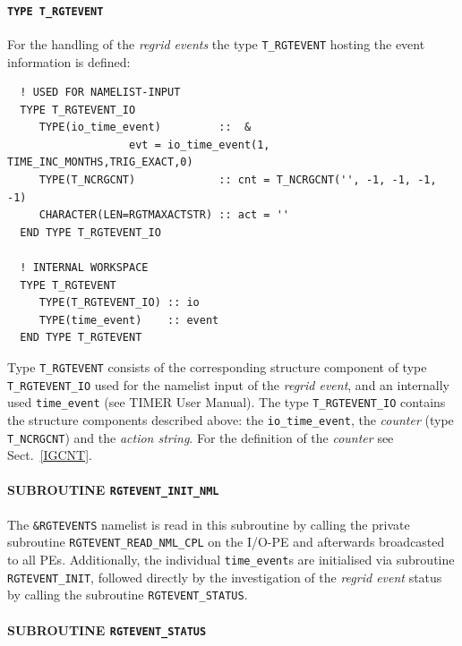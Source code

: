 \documentclass[11pt,twoside]{report}
\begin{document}
\paragraph{\color{red} \tt\bf TYPE T\_RGTEVENT\\\label{IGTRGTEVENT}}

For the handling of the {\it regrid events} the type 
\verb|T_RGTEVENT| hosting the event information is defined:
\begin{verbatim}
  ! USED FOR NAMELIST-INPUT
  TYPE T_RGTEVENT_IO
     TYPE(io_time_event)         ::  &
                   evt = io_time_event(1, TIME_INC_MONTHS,TRIG_EXACT,0)
     TYPE(T_NCRGCNT)             :: cnt = T_NCRGCNT('', -1, -1, -1, -1)
     CHARACTER(LEN=RGTMAXACTSTR) :: act = ''
  END TYPE T_RGTEVENT_IO

  ! INTERNAL WORKSPACE
  TYPE T_RGTEVENT
     TYPE(T_RGTEVENT_IO) :: io
     TYPE(time_event)    :: event
  END TYPE T_RGTEVENT
\end{verbatim}
 Type \verb|T_RGTEVENT| consists of the corresponding structure
 component of type \verb|T_RGTEVENT_IO| used for 
 the namelist input of the {\it regrid event}, and an internally used
 \verb|time_event| (see TIMER 
User Manual). The  type \verb|T_RGTEVENT_IO| contains the structure
 components described above: the \verb|io_time_event|, the {\it counter}
 (type \verb|T_NCRGCNT|) and the {\it  action string}. 
For the definition of the {\it counter} see Sect.~\ref{IGCNT}.\\

\paragraph{SUBROUTINE \color{blue} \tt\bf RGTEVENT\_INIT\_NML\\ \label{IGRGTEVINITNML}}
The \verb|&RGTEVENTS| namelist is read in this subroutine by
calling the  
private subroutine \verb|RGTEVENT_READ_NML_CPL| on the I/O-PE and 
afterwards broadcasted
to all PEs. Additionally, the individual \verb|time_event|s are
initialised via subroutine \verb|RGTEVENT_INIT|, followed directly by
the investigation of the 
{\it regrid event} status by calling the subroutine \verb|RGTEVENT_STATUS|.\\

\paragraph{SUBROUTINE \color{blue} \tt\bf RGTEVENT\_STATUS\\ \label{IGRGTEVSTATUS}}
\end{document}

